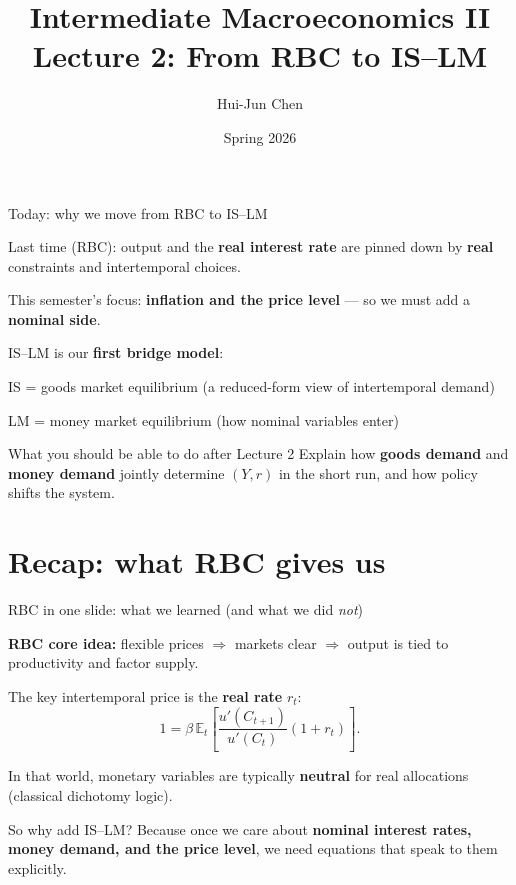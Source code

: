 \documentclass[aspectratio=169,xcolor=dvipsnames]{beamer}
\title[Lecture 2: IS--LM]{Intermediate Macroeconomics II\\\vspace{4pt}Lecture 2: From RBC to IS--LM}
\author[Hui-Jun Chen]{Hui-Jun Chen}
\institute[]{National Tsing Hua University}
\date{Spring 2026}
\let\tempone\itemize
\let\temptwo\enditemize
\renewenvironment{itemize}{\tempone\addtolength{\itemsep}{\fill}}{\temptwo}
\begin{document}
\begin{frame}
    \titlepage
\end{frame}

\begin{frame}{Today: why we move from RBC to IS--LM}
\small
\begin{itemize}
\item Last time (RBC): output and the \textbf{real interest rate} are pinned down by \textbf{real} constraints and intertemporal choices.
\item This semester's focus: \textbf{inflation and the price level} --- so we must add a \textbf{nominal side}.
\item IS--LM is our \textbf{first bridge model}:
\begin{itemize}
\item IS = goods market equilibrium (a reduced-form view of intertemporal demand)
\item LM = money market equilibrium (how nominal variables enter)
\end{itemize}
\end{itemize}

\begin{block}{What you should be able to do after Lecture 2}
Explain how \textbf{goods demand} and \textbf{money demand} jointly determine $(Y,r)$ in the short run, and how policy shifts the system.
\end{block}
\end{frame}

\section{Recap: what RBC gives us}

\begin{frame}{RBC in one slide: what we learned (and what we did \emph{not})}
\small
\begin{itemize}
\item \textbf{RBC core idea:} flexible prices $\Rightarrow$ markets clear $\Rightarrow$ output is tied to productivity and factor supply.
\item The key intertemporal price is the \textbf{real rate} $r_t$:
\[
1 = \beta \,\mathbb{E}_t\left[\frac{u'(C_{t+1})}{u'(C_t)}(1+r_t)\right].
\]
\item In that world, monetary variables are typically \textbf{neutral} for real allocations (classical dichotomy logic).
\end{itemize}

\begin{block}{So why add IS--LM?}
Because once we care about \textbf{nominal interest rates, money demand, and the price level}, we need equations that speak to them explicitly.
\end{block}
\end{frame}
\end{document}
